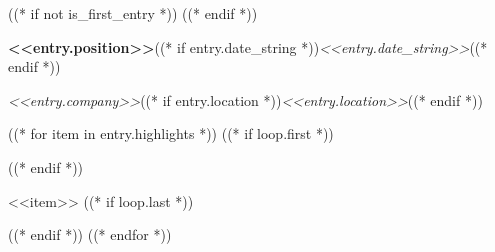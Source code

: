 ((* if not is_first_entry *))
\vspace{<<design.margins.entry_area.vertical_between>>}
((* endif *))

\begin{onecolentry}
    \textbf{<<entry.position>>}((* if entry.date_string *))\hfill \textit{<<entry.date_string>>}((* endif *))\par
    \textit{<<entry.company>>}((* if entry.location *))\hfill \textit{<<entry.location>>}((* endif *))
\end{onecolentry}

((* for item in entry.highlights *))
    ((* if loop.first *))
\vspace{<<design.margins.highlights_area.top>>}
\begin{onecolentry}
    \begin{highlights}
    ((* endif *))
        \item <<item>>
    ((* if loop.last *))
    \end{highlights}
\end{onecolentry}
    ((* endif *))
((* endfor *))
